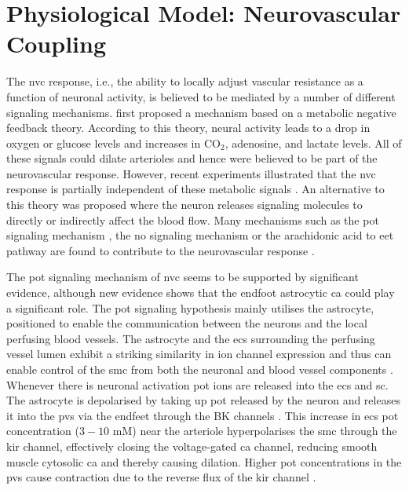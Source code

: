 \section{Physiological Model: Neurovascular Coupling}\label{sec:model}
The \gls{nvc} response, i.e., the ability to locally adjust vascular resistance as a function of neuronal activity, is believed to be mediated by a number of different signaling mechanisms. \citet{Roy1890} first proposed a  mechanism based on a metabolic negative feedback theory. According to this theory, neural activity leads to a drop in oxygen or glucose levels and increases in CO$_2$, adenosine, and lactate levels. All of these signals could dilate arterioles and hence were believed to be part of the neurovascular response. However, recent experiments illustrated that the \gls{nvc} response is partially independent of these metabolic signals \citep{Leithner2010, Lindauer2010, Mintun2001, Powers1996, Makani2010}. An alternative to this theory was proposed where the neuron releases signaling molecules to directly or indirectly affect the blood flow. Many mechanisms such as the \gls{pot} signaling mechanism \cite{Filosa2006}, the \gls{no} signaling mechanism or the arachidonic acid to \gls{eet} pathway are found to contribute to the neurovascular response \citep{Attwell2010}.

The \gls{pot} signaling mechanism of \gls{nvc} seems to be supported by significant evidence, although new evidence shows that the endfoot astrocytic \gls{ca} could play a significant role. The \gls{pot} signaling hypothesis mainly utilises the astrocyte,  positioned to enable the communication between the neurons and the local perfusing blood vessels. The astrocyte and the \glspl{ec} surrounding the perfusing vessel lumen exhibit a striking similarity in ion channel expression and thus can enable control of the \gls{smc} from both the neuronal and blood vessel components \citep{Longden2015}. Whenever there is neuronal activation \gls{pot} ions are released into the \gls{ecs} and \gls{sc}. The astrocyte is depolarised by taking up \gls{pot} released by the neuron and releases it into the \gls{pvs} via the endfeet through the BK channels \citep{Filosa2007}. This increase in \gls{ecs} \gls{pot} concentration ($3-10$ mM) near the arteriole hyperpolarises the \gls{smc} through the \gls{kir} channel, effectively closing the voltage-gated \gls{ca} channel, reducing smooth muscle cytosolic \gls{ca} and thereby causing dilation. Higher \gls{pot} concentrations in the \gls{pvs} cause contraction due to the reverse flux of the \gls{kir} channel \citep{Farr2011}. 

